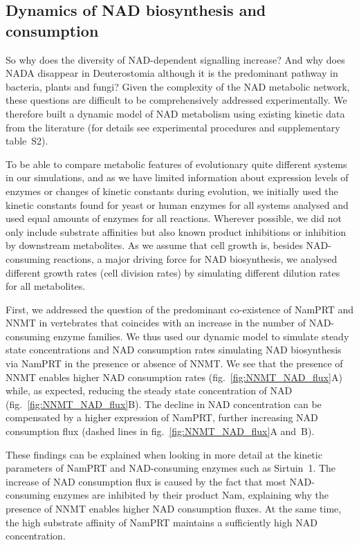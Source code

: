 \subsection{Dynamics of NAD biosynthesis and consumption}

So why does the diversity of NAD-dependent signalling increase? And why does NADA disappear in Deuterostomia although it is the predominant pathway in bacteria, plants and fungi? Given the complexity of the NAD metabolic network, these questions are difficult to be comprehensively addressed experimentally. We therefore built a dynamic model of NAD metabolism using existing kinetic data from the literature (for details see experimental procedures and supplementary table~S2).

To be able to compare metabolic features of evolutionary quite different systems in our simulations, and as we have limited information about expression levels of enzymes or changes of kinetic constants during evolution, we initially used the kinetic constants found for yeast or human enzymes for all systems analysed and used equal amounts of enzymes for all reactions. Wherever possible, we did not only include substrate affinities but also known product inhibitions or inhibition by downstream metabolites. As we assume that cell growth is, besides NAD-consuming reactions, a major driving force for NAD biosynthesis, we analysed different growth rates (cell division rates) by simulating different dilution rates for all metabolites.

First, we addressed the question of the predominant co-existence of NamPRT and NNMT in vertebrates that coincides with an increase in the number of NAD-consuming enzyme families. We thus used our dynamic model to simulate steady state concentrations and NAD consumption rates simulating NAD biosynthesis via NamPRT in the presence or absence of NNMT. We see that the presence of NNMT enables higher NAD consumption rates (fig.~\ref{fig:NNMT_NAD_flux}A) while, as expected, reducing the steady state concentration of NAD (fig.~\ref{fig:NNMT_NAD_flux}B). The decline in NAD concentration can be compensated by a higher expression of NamPRT, further increasing NAD consumption flux (dashed lines in fig.~\ref{fig:NNMT_NAD_flux}A and~B).

These findings can be explained when looking in more detail at the kinetic parameters of NamPRT and NAD-consuming enzymes such as Sirtuin~1. The increase of NAD consumption flux is caused by the fact that most NAD-consuming enzymes are inhibited by their product Nam, explaining why the presence of NNMT enables higher NAD consumption fluxes. At the same time, the high substrate affinity of NamPRT maintains a sufficiently high NAD concentration.


